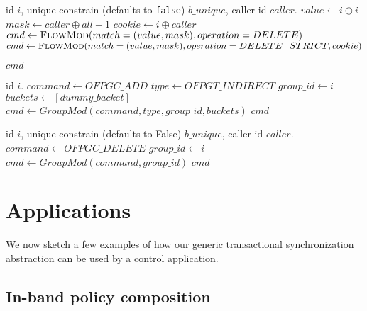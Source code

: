 \documentclass[conference]{sigcomm-alternate}
\newcommand{\concat}[0]{\oplus}
\begin{document}
\begin{algorithm}[t]
    \caption{$\textit{cond-delete}(x)$}
    \label{alg:template}
    \begin{algorithmic}[1]
    \Require id $i$, unique constrain (defaults to \texttt{false}) $b\_unique$, caller id $caller$.
    		\State $value \gets i\concat i$
    		\State $mask \gets caller\concat all-1$
    		\State $cookie \gets i\concat caller$
    			\State $cmd\gets \textsc{FlowMod}(match=(value,mask), operation=DELETE) $
    		\Else
    		    \State $cmd\gets \textsc{FlowMod}(match=(value,mask), operation=DELETE\_STRICT, cookie) $
    		\EndIf
			
			\Return $cmd$
    \end{algorithmic}
\end{algorithm}


\begin{algorithm}[t]
    \caption{$\textit{add}(x)$}
    \label{alg:add}
    \begin{algorithmic}[1]
    \Require  id $i$.
    		\State $command \gets OFPGC\_ADD$
    		\State $type \gets OFPGT\_INDIRECT$
    		\State $group\_id \gets i$
    		\State $buckets \gets [dummy\_backet]$
    		\State $cmd\gets GroupMod(command, type, group\_id, buckets) $
			\Return $cmd$
    \end{algorithmic}
\end{algorithm}

\begin{algorithm}[t]
    \caption{$\textit{delete}(x)$}
    \label{alg:delete}
    \begin{algorithmic}[1]
    \Require id $i$, unique constrain (defaults to False) $b\_unique$, caller id $caller$.
    		\State $command \gets OFPGC\_DELETE$
    		\State $group\_id \gets i$
    		\State $cmd\gets GroupMod(command, group\_id) $
			\Return $cmd$
    \end{algorithmic}
\end{algorithm}


\section{Applications}\label{sec:apps}

We now sketch a few examples of how our generic transactional synchronization
abstraction  can be used by a control application.

\subsection{In-band policy composition}
\end{document}
